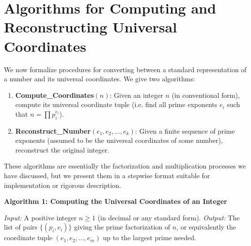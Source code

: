 \documentclass[11pt]{article}
\begin{document}
\section{Algorithms for Computing and Reconstructing Universal Coordinates}

We now formalize procedures for converting between a standard representation of a number and its universal coordinates. We give two algorithms:
\begin{enumerate}[label=\textbf{Algorithm \arabic*.}, leftmargin=3.5em]
\item \textbf{Compute\_Coordinates$(n)$}: Given an integer $n$ (in conventional form), compute its universal coordinate tuple (i.e. find all prime exponents $e_i$ such that $n = \prod p_i^{e_i}$).
\item \textbf{Reconstruct\_Number$(e_1,e_2,\ldots,e_k)$}: Given a finite sequence of prime exponents (assumed to be the universal coordinates of some number), reconstruct the original integer.
\end{enumerate}

These algorithms are essentially the factorization and multiplication processes we have discussed, but we present them in a stepwise format suitable for implementation or rigorous description.

\medskip
\noindent\textbf{Algorithm 1: Computing the Universal Coordinates of an Integer}

\noindent\textit{Input:} A positive integer $n \ge 1$ (in decimal or any standard form).  
\textit{Output:} The list of pairs $\{(p_i, e_i)\}$ giving the prime factorization of $n$, or equivalently the coordinate tuple $(e_1, e_2, \ldots, e_m)$ up to the largest prime needed.
\end{document}
